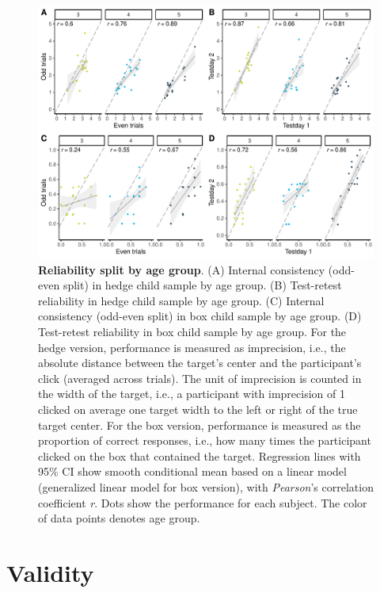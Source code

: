 \documentclass[
  man,floatsintext]{apa6}
\begin{document}
\begin{figure}

{\centering \includegraphics[width=1\linewidth]{../figures/tango_supplements_reli_byagegroup} 

}

\caption{\textbf{Reliability split by age group}. (A) Internal consistency (odd-even split) in hedge child sample by age group. (B) Test-retest reliability in hedge child sample by age group. (C) Internal consistency (odd-even split) in box child sample by age group. (D) Test-retest reliability in box child sample by age group. For the hedge version, performance is measured as imprecision, i.e., the absolute distance between the target's center and the participant's click (averaged across trials). The unit of imprecision is counted in the width of the target, i.e., a participant with imprecision of 1 clicked on average one target width to the left or right of the true target center. For the box version, performance is measured as the proportion of correct responses, i.e., how many times the participant clicked on the box that contained the target. Regression lines with 95\% CI show smooth conditional mean based on a linear model (generalized linear model for box version), with \emph{Pearson}'s correlation coefficient \emph{r}. Dots show the performance for each subject. The color of data points denotes age group.}\label{fig:fig4}
\end{figure}

\newpage

\hypertarget{validity}{%
\section{Validity}\label{validity}}
\end{document}
